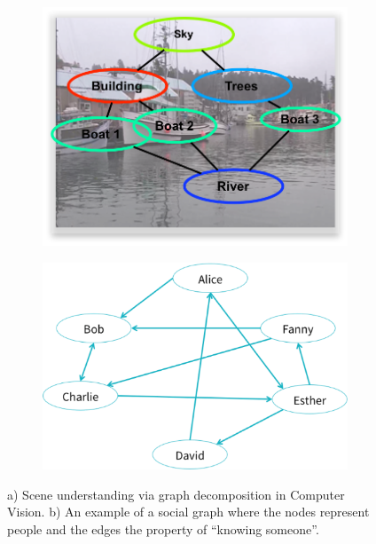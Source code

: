 \begin{figure}[ht]
    \begin{subfigure}{.45\linewidth}
        \centering
        \includegraphics[width=\linewidth]{Figures/scene}
        \caption{}
        \label{fig:scene}
    \end{subfigure}
    \begin{subfigure}{.45\linewidth}
        \centering
        \includegraphics[width=\linewidth]{Figures/socialnetwork}
        \caption{}
        \label{fig:network}
    \end{subfigure}
\caption{a) Scene understanding via graph decomposition in Computer Vision. b)
        An example of a social graph where the nodes represent people and 
        the edges the property of ``knowing someone''.}
\end{figure}

